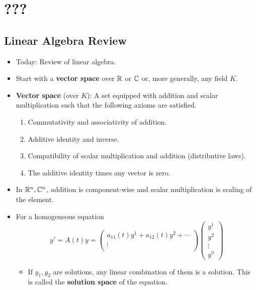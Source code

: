 \documentclass[../notes.tex]{subfiles}
\begin{document}
\chapter{???}
\section{Linear Algebra Review}
\begin{itemize}
    \item {}Today: Review of linear algebra.
    \item Start with a \textbf{vector space} over $\mathbb{R}$ or $\mathbb{C}$ or, more generally, any field $K$.
    \item \textbf{Vector space} (over $K$): A set equipped with addition and scalar multiplication such that the following axioms are satisfied.
    \begin{enumerate}
        \item Commutativity and associativity of addition.
        \item Additive identity and inverse.
        \item Compatibility of scalar multiplication and addition (distributive laws).
        \item The additive identity times any vector is zero.
    \end{enumerate}
    \item In $\mathbb{R}^n,\mathbb{C}^n$, addition is component-wise and scalar multiplication is scaling of the element.
    \item For a homogeneous equation
    \begin{equation*}
        y' = A(t)y
        =
        \begin{pmatrix}
            a_{11}(t)y^1+a_{12}(t)y^2+\cdots\\
            \vdots\\
        \end{pmatrix}
        \begin{pmatrix}
            y^1\\
            y^2\\
            \vdots\\
            y^n
        \end{pmatrix}
    \end{equation*}
    \begin{itemize}
        \item If $y_1,y_2$ are solutions, any linear combination of them is a solution. This is called the \textbf{solution space} of the equation.
    \end{itemize}

\end{itemize}
\end{document}
